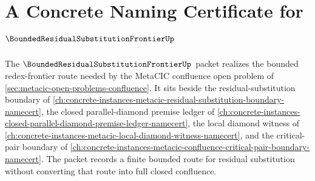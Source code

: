 \chapter{A Concrete Naming Certificate for $\BoundedResidualSubstitutionFrontierUp$}
\label{ch:concrete-instances-bounded-residual-substitution-frontier-namecert}

The $\BoundedResidualSubstitutionFrontierUp$ packet realizes the bounded redex-frontier route needed by the MetaCIC confluence open problem of \autoref{sec:metacic-open-problems-confluence}. It sits beside the residual-substitution boundary of \autoref{ch:concrete-instances-metacic-residual-substitution-boundary-namecert}, the closed parallel-diamond premise ledger of \autoref{ch:concrete-instances-closed-parallel-diamond-premise-ledger-namecert}, the local diamond witness of \autoref{ch:concrete-instances-metacic-local-diamond-witness-namecert}, and the critical-pair boundary of \autoref{ch:concrete-instances-metacic-confluence-critical-pair-boundary-namecert}. The packet records a finite bounded route for residual substitution without converting that route into full closed confluence.



